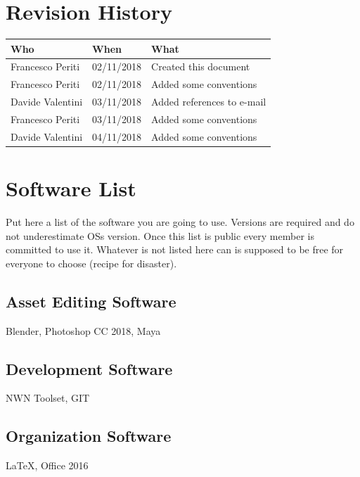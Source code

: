 \documentclass[12pt]{article}
\begin{document}
\clearpage

\section{Revision History}
\begin{center}
\begin{table}[H]
\begin{tabular}{|l|l|l|}
\hline
\cellcolor{gray}\textbf{Who} & \cellcolor{gray}\textbf{When} & \cellcolor{gray}\textbf{What} \\ \hline
Francesco Periti & 02/11/2018 & Created this document \\ \hline
Francesco Periti & 02/11/2018 & Added some conventions \\ \hline
Davide Valentini & 03/11/2018 & Added references to e-mail \\ \hline
Francesco Periti & 03/11/2018 & Added some conventions \\ \hline
Davide Valentini & 04/11/2018 & Added some conventions \\ \hline
\end{tabular}
\end{table}
\end{center}

\clearpage

\section{Software List}
Put here a list of the software you are going to use. Versions are required and do not underestimate OSs version.
Once this list is public every member is committed to use it.
Whatever is not listed here can is supposed to be free for everyone to choose (recipe for disaster).

\subsection{Asset Editing Software}
Blender, Photoshop CC 2018, Maya

\subsection{Development Software}
NWN Toolset, GIT

\subsection{Organization Software}
LaTeX, Office 2016
\end{document}
